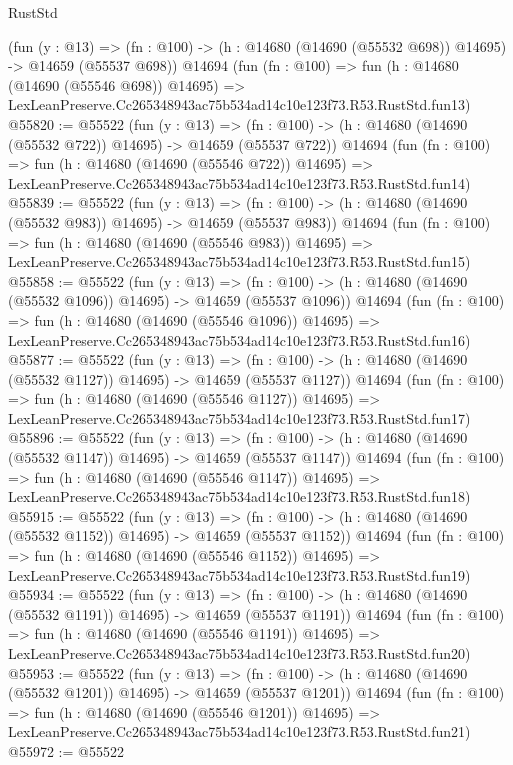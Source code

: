 \begin{lexlean}{RustStd}
\begin{coremodule}
    (fun (y : @13) =>
    (fn : @100) -> (h : @14680 (@14690 (@55532 @698)) @14695) -> @14659 (@55537 @698))
    @14694
    (fun (fn : @100) =>
    fun (h : @14680 (@14690 (@55546 @698)) @14695) =>
    LexLeanPreserve.Cc265348943ac75b534ad14c10e123f73.R53.RustStd.fun13)
@55820 := @55522
    (fun (y : @13) =>
    (fn : @100) -> (h : @14680 (@14690 (@55532 @722)) @14695) -> @14659 (@55537 @722))
    @14694
    (fun (fn : @100) =>
    fun (h : @14680 (@14690 (@55546 @722)) @14695) =>
    LexLeanPreserve.Cc265348943ac75b534ad14c10e123f73.R53.RustStd.fun14)
@55839 := @55522
    (fun (y : @13) =>
    (fn : @100) -> (h : @14680 (@14690 (@55532 @983)) @14695) -> @14659 (@55537 @983))
    @14694
    (fun (fn : @100) =>
    fun (h : @14680 (@14690 (@55546 @983)) @14695) =>
    LexLeanPreserve.Cc265348943ac75b534ad14c10e123f73.R53.RustStd.fun15)
@55858 := @55522
    (fun (y : @13) =>
    (fn : @100) -> (h : @14680 (@14690 (@55532 @1096)) @14695) -> @14659 (@55537 @1096))
    @14694
    (fun (fn : @100) =>
    fun (h : @14680 (@14690 (@55546 @1096)) @14695) =>
    LexLeanPreserve.Cc265348943ac75b534ad14c10e123f73.R53.RustStd.fun16)
@55877 := @55522
    (fun (y : @13) =>
    (fn : @100) -> (h : @14680 (@14690 (@55532 @1127)) @14695) -> @14659 (@55537 @1127))
    @14694
    (fun (fn : @100) =>
    fun (h : @14680 (@14690 (@55546 @1127)) @14695) =>
    LexLeanPreserve.Cc265348943ac75b534ad14c10e123f73.R53.RustStd.fun17)
@55896 := @55522
    (fun (y : @13) =>
    (fn : @100) -> (h : @14680 (@14690 (@55532 @1147)) @14695) -> @14659 (@55537 @1147))
    @14694
    (fun (fn : @100) =>
    fun (h : @14680 (@14690 (@55546 @1147)) @14695) =>
    LexLeanPreserve.Cc265348943ac75b534ad14c10e123f73.R53.RustStd.fun18)
@55915 := @55522
    (fun (y : @13) =>
    (fn : @100) -> (h : @14680 (@14690 (@55532 @1152)) @14695) -> @14659 (@55537 @1152))
    @14694
    (fun (fn : @100) =>
    fun (h : @14680 (@14690 (@55546 @1152)) @14695) =>
    LexLeanPreserve.Cc265348943ac75b534ad14c10e123f73.R53.RustStd.fun19)
@55934 := @55522
    (fun (y : @13) =>
    (fn : @100) -> (h : @14680 (@14690 (@55532 @1191)) @14695) -> @14659 (@55537 @1191))
    @14694
    (fun (fn : @100) =>
    fun (h : @14680 (@14690 (@55546 @1191)) @14695) =>
    LexLeanPreserve.Cc265348943ac75b534ad14c10e123f73.R53.RustStd.fun20)
@55953 := @55522
    (fun (y : @13) =>
    (fn : @100) -> (h : @14680 (@14690 (@55532 @1201)) @14695) -> @14659 (@55537 @1201))
    @14694
    (fun (fn : @100) =>
    fun (h : @14680 (@14690 (@55546 @1201)) @14695) =>
    LexLeanPreserve.Cc265348943ac75b534ad14c10e123f73.R53.RustStd.fun21)
@55972 := @55522

\end{coremodule}
\end{lexlean}
